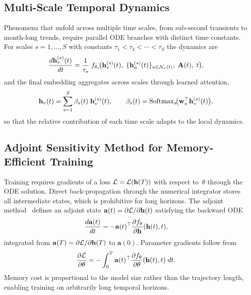 \subsection{Multi-Scale Temporal Dynamics}

Phenomena that unfold across multiple time scales, from sub-second transients to month-long trends, require parallel ODE branches with distinct time constants. For scales $s=1,\dots,S$ with constants $\tau_1<\tau_2<\cdots<\tau_S$ the dynamics are
\begin{equation}
\frac{d\mathbf{h}_v^{(s)}(t)}{dt}
= \frac{1}{\tau_s}\;f_{\theta_s}\!\bigl(
  \mathbf{h}_v^{(s)}(t),\;\{\mathbf{h}_u^{(s)}(t)\}_{u\in\mathcal{N}_v(t)},\;
  \mathbf{A}(t),\;t\bigr),
\label{eq:ct_tgnn_multi}
\end{equation}
and the final embedding aggregates across scales through learned attention,
\begin{equation}
\mathbf{h}_v(t)
= \sum_{s=1}^{S}\beta_s(t)\;\mathbf{h}_v^{(s)}(t),
\qquad
\beta_s(t) = \mathrm{Softmax}_s\!\bigl(\mathbf{w}_s^\top\mathbf{h}_v^{(s)}(t)\bigr),
\label{eq:ct_tgnn_scale_fuse}
\end{equation}
so that the relative contribution of each time scale adapts to the local dynamics.

\subsection{Adjoint Sensitivity Method for Memory-Efficient Training}

Training requires gradients of a loss $\mathcal{L}=\mathcal{L}(\mathbf{h}(T))$ with respect to~$\theta$ through the ODE solution. Direct back-propagation through the numerical integrator stores all intermediate states, which is prohibitive for long horizons. The adjoint method~\cite{Pontryagin1962,Chen2018} defines an adjoint state $\mathbf{a}(t)=\partial\mathcal{L}/\partial\mathbf{h}(t)$ satisfying the backward ODE
\begin{equation}
\frac{d\mathbf{a}(t)}{dt}
= -\mathbf{a}(t)^\top\frac{\partial f_\theta}{\partial\mathbf{h}}(\mathbf{h}(t),t),
\label{eq:adjoint_ode}
\end{equation}
integrated from $\mathbf{a}(T)=\partial\mathcal{L}/\partial\mathbf{h}(T)$ to $\mathbf{a}(0)$. Parameter gradients follow from
\begin{equation}
\frac{\partial\mathcal{L}}{\partial\theta}
= -\int_0^T \mathbf{a}(t)^\top
  \frac{\partial f_\theta}{\partial\theta}(\mathbf{h}(t),t)\;dt.
\label{eq:adjoint_param}
\end{equation}
Memory cost is proportional to the model size rather than the trajectory length, enabling training on arbitrarily long temporal horizons.

